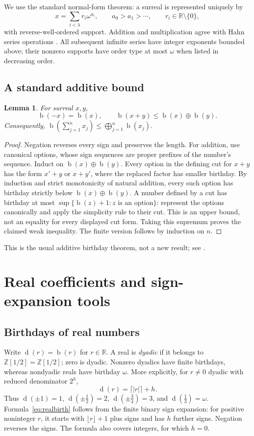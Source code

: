 \documentclass[11pt,letterpaper]{article}
\numberwithin{equation}{section}
\newtheorem{lemma}[theorem]{Lemma}
\theoremstyle{definition}
\theoremstyle{remark}
\newcommand{\R}{\mathbb{R}}
\newcommand{\Z}{\mathbb{Z}}
\newcommand{\D}{\mathbb{Z}[1/2]}
\newcommand{\bd}{\operatorname{b}}
\newcommand{\rd}{\operatorname{d}}
\newcommand{\ns}{\mathbin{\oplus}}
\newcommand{\bigns}{\mathop{\bigoplus}}
\begin{document}
We use the standard normal-form theorem: a surreal is represented uniquely by
\[
 x=\sum_{i<\lambda}r_i\omega^{a_i},
 \qquad a_0>a_1>\cdots,
 \qquad r_i\in\R\setminus\{0\},
\]
with reverse-well-ordered support. Addition and multiplication agree with Hahn
series operations \cite{Gonshor1986,BG2022}. All subsequent infinite series have
integer exponents bounded above; their nonzero supports have order type at most
$\omega$ when listed in decreasing order.

\subsection{A standard additive bound}
\begin{lemma}\label{lem:add}
For surreal $x,y$,
\[
 \bd(-x)=\bd(x),\qquad
 \bd(x+y)\leq\bd(x)\ns\bd(y).
\]
Consequently, $\bd(\sum_{j=1}^n x_j)\leq\bigns_{j=1}^n\bd(x_j)$.
\end{lemma}
\begin{proof}
Negation reverses every sign and preserves the length. For addition, use
canonical options, whose sign sequences are proper prefixes of the number's
sequence. Induct on $\bd(x)\oplus\bd(y)$. Every option in the defining cut for
$x+y$ has the form $x'+y$ or $x+y'$, where the replaced factor has smaller
birthday. By induction and strict monotonicity of natural addition, every such
option has birthday strictly below $\bd(x)\oplus\bd(y)$. A number defined by a
cut has birthday at most $\sup\{\bd(z)+1:z\text{ is an option}\}$:
represent the options canonically and apply the simplicity rule to their cut.
This is an upper bound, not an equality for every displayed cut form.
Taking this supremum proves the claimed weak inequality. The finite version
follows by induction on $n$.
\end{proof}
This is the usual additive birthday theorem, not a new result; see
\cite[p.~96]{Gonshor1986}.

\section{Real coefficients and sign-expansion tools}
\label{sec:signs}
\subsection{Birthdays of real numbers}
Write $\rd(r)=\bd(r)$ for $r\in\R$. A real is \emph{dyadic} if it belongs to
$\D=\Z[1/2]$; zero is dyadic. Nonzero dyadics have finite birthdays, whereas
nondyadic reals have birthday $\omega$. More explicitly, for
$r\neq0$ dyadic with reduced denominator $2^h$,
\begin{equation}\label{eq:realbirth}
 \rd(r)=\lceil |r|\rceil+h.
\end{equation}
Thus $\rd(\pm1)=1$, $\rd(\pm\tfrac12)=2$, $\rd(\pm\tfrac34)=3$, and
$\rd(\tfrac13)=\omega$. Formula~\eqref{eq:realbirth} follows from the finite
binary sign expansion: for positive noninteger $r$, it starts with
$\lfloor r\rfloor+1$ plus signs and has $h$ further signs. Negation reverses
the signs. The formula also covers integers, for which $h=0$.
\end{document}
